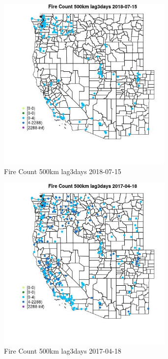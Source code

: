 \begin{figure} 
\centering  
\includegraphics[width=0.77\textwidth]{Code_Outputs/Report_ML_input_PM25_Step4_part_e_de_duplicated_aves_compiled_2019-05-21wNAs_MapObsFire_Count_500km_lag3days2018-07-15.jpg} 
\caption{\label{fig:Report_ML_input_PM25_Step4_part_e_de_duplicated_aves_compiled_2019-05-21wNAsMapObsFire_Count_500km_lag3days2018-07-15}Fire Count 500km lag3days 2018-07-15} 
\end{figure} 
 

\begin{figure} 
\centering  
\includegraphics[width=0.77\textwidth]{Code_Outputs/Report_ML_input_PM25_Step4_part_e_de_duplicated_aves_compiled_2019-05-21wNAs_MapObsFire_Count_500km_lag3days2017-04-18.jpg} 
\caption{\label{fig:Report_ML_input_PM25_Step4_part_e_de_duplicated_aves_compiled_2019-05-21wNAsMapObsFire_Count_500km_lag3days2017-04-18}Fire Count 500km lag3days 2017-04-18} 
\end{figure} 
 

